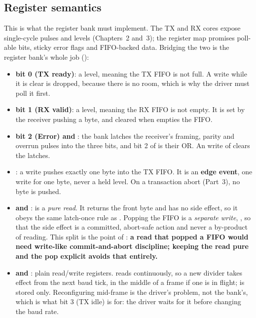 \subsection{Register semantics}
\label{proto:semantics}
This is what the register bank must implement. The TX and RX cores expose single-cycle pulses and
levels (Chapters~2 and~3); the register map promises poll-able bits, sticky error flags and
FIFO-backed data. Bridging the two is the register bank's whole job ():
\begin{itemize}
  \item \textbf{ bit 0 (TX ready)}: a level, meaning the TX FIFO is not full. A
     write while it is clear is dropped, because there is no room, which is why the
    driver must poll it first.
  \item \textbf{ bit 1 (RX valid)}: a level, meaning the RX FIFO is not empty. It is
    set by the receiver pushing a byte, and cleared when  empties the FIFO.
  \item \textbf{ bit 2 (Error) and }: the bank latches the receiver's
    framing, parity and overrun pulses into the three  bits, and bit 2 of
     is their OR. An  write of  clears the latches.
  \item \textbf{}: a write pushes exactly one byte into the TX FIFO. It is an
    \textbf{edge event}, one write for one byte, never a held level. On a transaction abort
    (Part~3), no byte is pushed.
  \item \textbf{ and }:  is a \emph{pure read}. It returns
    the front byte and has no side effect, so it obeys the same latch-once rule as .
    Popping the FIFO is a \emph{separate write}, , so that the side effect is a
    committed, abort-safe action and never a by-product of reading. This split is the point of
    : \textbf{a read that popped a FIFO would need write-like commit-and-abort
    discipline; keeping the read pure and the pop explicit avoids that entirely.}
  \item \textbf{ and }: plain read/write registers.  reads
     continuously, so a new divider takes effect from the next baud tick, in the
    middle of a frame if one is in flight;  is stored only. Reconfiguring mid-frame is
    the driver's problem, not the bank's, which is what  bit 3 (TX idle) is for: the
    driver waits for it before changing the baud rate.
\end{itemize}

